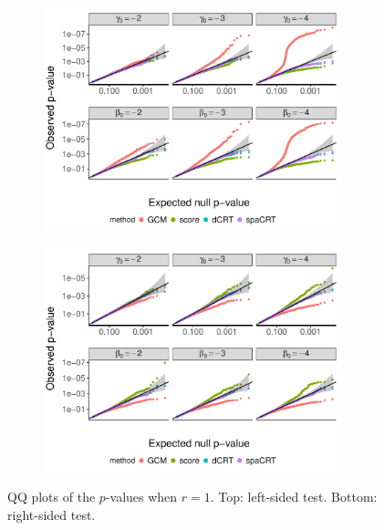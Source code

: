 \documentclass[12pt]{article}
\theoremstyle{definition}
\begin{document}
  \begin{figure}[!ht]
	\centering
	\begin{subfigure}{\textwidth}
		\centering
		\includegraphics[width=0.95\textwidth]{figures-and-tables/simulation/NB-regression/QQ/disp-1-QQ-LEFT.pdf}
	\end{subfigure}

	\begin{subfigure}{\textwidth}
		\centering
		\includegraphics[width=0.95\textwidth]{figures-and-tables/simulation/NB-regression/QQ/disp-1-QQ-RIGHT.pdf}
	\end{subfigure}
	\caption{QQ plots of the $p$-values when $r=1$. Top: left-sided test. Bottom: right-sided test. }
	\label{fig:simulation-CRISPR-screens-disp-1-QQ}
  \end{figure}
\end{document}
